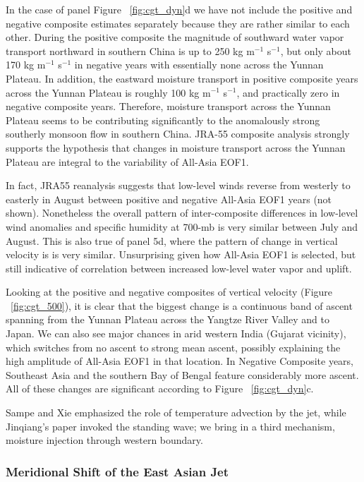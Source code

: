 	In the case of panel Figure ~\ref{fig:cgt_dyn}d we have not include the positive and negative composite estimates separately because they are rather similar to each other. During the positive composite the magnitude of southward water vapor transport northward in southern China is up to 250 kg m$^{-1}$ s$^{-1}$, but only about 170 kg m$^{-1}$ s$^{-1}$ in negative years with essentially none across the Yunnan Plateau.  In addition, the eastward moisture transport in positive composite years across the Yunnan Plateau is roughly 100 kg m$^{-1}$ s$^{-1}$, and practically zero in negative composite years. Therefore, moisture transport across the Yunnan Plateau seems to be contributing significantly to the anomalously strong southerly monsoon flow in southern China. JRA-55 composite analysis strongly supports the hypothesis that changes in moisture transport across the Yunnan Plateau are integral to the variability of All-Asia EOF1.
						
	In fact, JRA55 reanalysis suggests that low-level winds reverse from westerly to easterly in August between positive and negative All-Asia EOF1 years (not shown). Nonetheless the overall pattern of inter-composite differences in low-level wind anomalies and specific humidity at 700-mb is very similar between July and August. This is also true of panel 5d, where the pattern of change in vertical velocity is is very similar. Unsurprising given how All-Asia EOF1 is selected, but still indicative of correlation between increased low-level water vapor and uplift.
			
	Looking at the positive and negative composites of vertical velocity (Figure ~\ref{fig:cgt_500}), it is clear that the biggest change is a continuous band of ascent spanning from the Yunnan Plateau across the Yangtze River Valley and to Japan. We can also see major chances in arid western India (Gujarat vicinity), which switches from no ascent to strong mean ascent, possibly explaining the high amplitude of All-Asia EOF1 in that location. In Negative Composite years, Southeast Asia and the southern Bay of Bengal feature considerably more ascent. All of these changes are significant according to Figure ~\ref{fig:cgt_dyn}c.
	
	Sampe and Xie emphasized the role of temperature advection by the jet, while Jinqiang's paper invoked the standing wave; we bring in a third mechanism, moisture injection through western boundary.
	
\subsubsection{Meridional Shift of the East Asian Jet}

